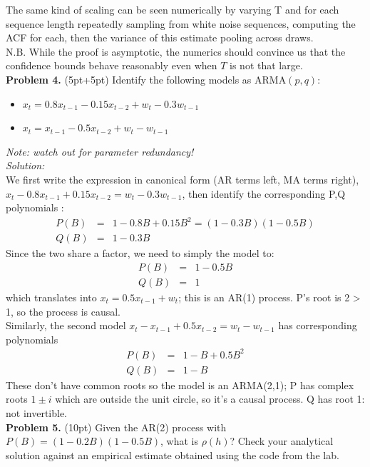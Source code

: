 \documentclass[12pt]{article}
\begin{document}
\noindent The same kind of scaling can be seen numerically by varying T and for each sequence length repeatedly sampling from white noise sequences, computing the ACF for each, then the variance of this estimate pooling across draws. \\
N.B. While the proof is asymptotic, the numerics should convince us that the confidence bounds behave reasonably even when $T$ is not that large.\\


\noindent \textbf{Problem 4.} (5pt+5pt) Identify the following models as $\mathrm{ARMA}(p,q)$:
\begin{itemize}
\item $x_t = 0.8 x_{t-1} - 0.15 x_{t-2} + w_t - 0.3 w_{t-1}$
\item $x_t =  x_{t-1} - 0.5 x_{t-2} + w_t - w_{t-1}$
\end{itemize}
\emph{Note: watch out for parameter redundancy!}\\


\noindent \emph{Solution:} 
\\
We first write the expression in canonical form (AR terms left, MA terms right), 
$x_t - 0.8 x_{t-1} + 0.15 x_{t-2} = w_t - 0.3 w_{t-1}$, then identify the corresponding P,Q polynomials :
\begin{eqnarray*}
P(B) &=& 1 - 0.8 B + 0.15 B^2 = (1-0.3 B)(1-0.5B) \\
 Q(B) &=& 1- 0.3 B
\end{eqnarray*}
Since the two share a factor, we need to simply the model  to:
\begin{eqnarray*}
P(B) &=&  1-0.5B \\
 Q(B) &=& 1
\end{eqnarray*}
which translates into $x_t = 0.5x_{t-1} + w_t$; this is an AR(1) process. 
P's root is 2 > 1,  so the process is causal.\\

\noindent  Similarly, the second model $x_t - x_{t-1} + 0.5 x_{t-2} = w_t - w_{t-1}$  has corresponding polynomials
\begin{eqnarray*}
P(B) &=& 1 -  B + 0.5 B^2  \\
 Q(B) &=& 1- B
\end{eqnarray*}
These don't have common roots so the model is an ARMA(2,1); P has complex roots $1\pm i$ which are outside the unit circle, so it's a causal process. 
Q has root 1: not invertible.
\\


\noindent \textbf{Problem 5.} (10pt) Given the AR(2) process with $P(B) = (1-0.2B)(1-0.5B)$, what is $\rho(h)$? 
 Check your analytical solution against an empirical estimate obtained using the code from the lab.\\
 
\end{document}
